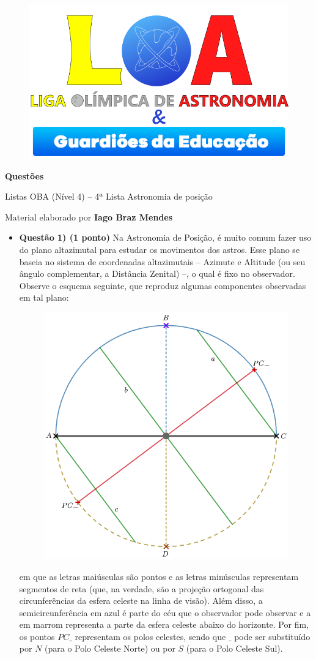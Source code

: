 \documentclass[a4paper, 12pt]{article}
\newcommand{\cabecalho}[4]
{
	\begin{figure}
		\centering
		\href{https://ligaolimpicadeastronomia.com.br/}{\includegraphics[scale=0.6]{./img/logos.png}}
	\end{figure}
	
	\begin{center}
		\begin{large}
			\textbf{#1}	
		\end{large}
			\linebreak Listas OBA (Nível 4) -- #2ª Lista
			\linebreak #3
		\end{center}
	
	\begin{flushright}
		Material elaborado por \textbf{#4}
	\end{flushright}
}
\begin{document}
	\cabecalho{Questões}{4}{Astronomia de posição}{Iago Braz Mendes}
	
	\begin{flushleft}
	\begin{itemize}
		\item \textbf{Questão 1) (1 ponto)} Na Astronomia de Posição, é muito comum fazer uso do plano altazimutal para estudar os movimentos dos astros. Esse plano se baseia no sistema de coordenadas altazimutais -- Azimute e Altitude (ou seu ângulo complementar, a Distância Zenital) --, o qual é fixo no observador. Observe o esquema seguinte, que reproduz algumas componentes observadas em tal plano:
			\begin{figure}[H]
				\centering
				\includegraphics[scale=0.5]{./img/1.png}
			\end{figure}
			em que as letras maiúsculas são pontos e as letras minúsculas representam segmentos de reta (que, na verdade, são a projeção ortogonal das circunferências da esfera celeste na linha de visão). Além disso, a semicircunferência em azul é parte do céu que o observador pode observar e a em marrom representa a parte da esfera celeste abaixo do horizonte. Por fim, os pontos $PC\_$ representam os polos celestes, sendo que $\_$ pode ser substituído por $N$ (para o Polo Celeste Norte) ou por $S$ (para o Polo Celeste Sul).
			\begin{itemize}

\end{itemize}
\end{itemize}
\end{flushleft}
\end{document}
